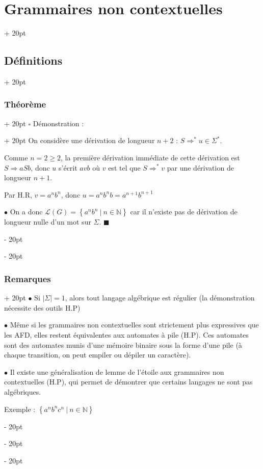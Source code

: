 \documentclass[a4paper, 12pt, twoside]{article}
\newcommand{\N}{\mathbb{N}} %
\newcommand{\set}[1]{\left\{ #1 \right\}}
\newcommand{\abs}[1]{\left\lvert #1 \right\rvert}
\renewcommand{\ge}{\geqslant}
\newcommand{\ind}[1][20pt]{\advance\leftskip + #1}
\newcommand{\deind}[1][20pt]{\advance\leftskip - #1}
\newenvironment{indt}[2][20pt]{#2 \par \ind[#1]}{\par \deind} %
\newenvironment{proof}[1][{Démonstration :}]{\begin{indt}{$\square$ #1}}{$\blacksquare$ \end{indt}}
\begin{document}
\begin{indt}{\section{Grammaires non contextuelles}}
\begin{indt}{\subsection{Définitions}}
\begin{indt}{\subsubsection{Théorème}}
\begin{proof}
                    On considère une dérivation de longueur $n + 2$ : $S \Rightarrow^* u \in \Sigma^*$.

                    Comme $n = 2 \ge 2$, la première dérivation immédiate de cette dérivation est $S \Rightarrow aSb$, donc $u$ s'écrit $avb$ où $v$ est tel que $S \Rightarrow^* v$ par une dérivation de longueur $n + 1$.

                    Par H.R, $v = a^n b^n$, donc $u = a^n b^n b = a^{n + 1} b^{n + 1}$

                    \vspace{12pt}
                    
                    $\bullet$  On a donc $\mathcal L(G) = \set{a^n b^n\ |\ n \in \N}$ car il n'existe pas de dérivation de longueur nulle d'un mot sur $\Sigma$.
                \end{proof}
            \end{indt}

            \vspace{12pt}
            
            \begin{indt}{\subsubsection{Remarques}}
                $\bullet$ Si $\abs \Sigma = 1$, alors tout langage algébrique est régulier (la démonstration nécessite des outils H.P)

                \vspace{6pt}
                
                $\bullet$ Même si les grammaires non contextuelles sont strictement plus expressives que les AFD, elles restent équivalentes aux automates à pile (H.P).
                Ces automates sont des automates munis d'une mémoire binaire sous la forme d'une pile (à chaque transition, on peut empiler ou dépiler un caractère).

                \vspace{6pt}
                
                $\bullet$ Il existe une généralisation de lemme de l'étoile aux grammaires non contextuelles (H.P), qui permet de démontrer que certains langages ne sont pas algébriques.

                Exemple : $\set{a^n b^n c^n\ |\ n \in \N}$
            \end{indt}
        \end{indt}


\end{indt}
\end{document}
